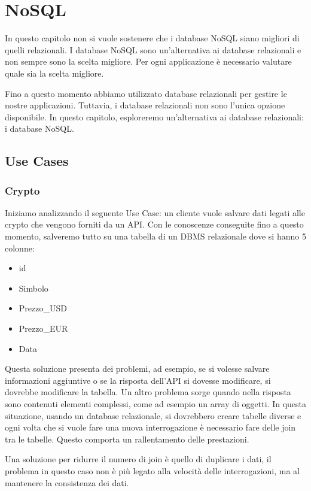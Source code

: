 \chapter{NoSQL}
\begin{nota}
      In questo capitolo non si vuole sostenere che i database NoSQL siano
      migliori di quelli relazionali. I database NoSQL sono un'alternativa
      ai database relazionali e non sempre sono la scelta migliore. Per ogni
      applicazione è necessario valutare quale sia la scelta migliore.
\end{nota}
Fino a questo momento abbiamo utilizzato database relazionali per gestire le
nostre applicazioni. Tuttavia, i database relazionali non sono l'unica
opzione disponibile. In questo capitolo, esploreremo un'alternativa ai
database relazionali: i database NoSQL.
\section*{Use Cases}
\subsection*{Crypto}
Iniziamo analizzando il seguente Use Case: un cliente vuole salvare dati legati
alle crypto che vengono forniti da un API. Con le conoscenze conseguite fino a
questo momento, salveremo tutto su una tabella di un DBMS relazionale dove si
hanno 5 colonne:
\begin{itemize}
      \item id
      \item Simbolo
      \item Prezzo\_USD
      \item Prezzo\_EUR
      \item Data
\end{itemize}
Questa soluzione presenta dei problemi, ad esempio, se si volesse salvare
informazioni aggiuntive o se la risposta dell'API si dovesse modificare, si
dovrebbe modificare la tabella. Un altro problema sorge quando nella risposta
sono contenuti elementi complessi, come ad esempio un array di oggetti. In questa
situazione, usando un database relazionale, si dovrebbero creare tabelle diverse
e ogni volta che si vuole fare una nuova interrogazione è necessario fare delle
join tra le tabelle. Questo comporta un rallentamento delle prestazioni.

Una soluzione per ridurre il numero di join è quello di duplicare i dati, il
problema in questo caso non è più legato alla velocità delle interrogazioni, ma
al mantenere la consistenza dei dati.

